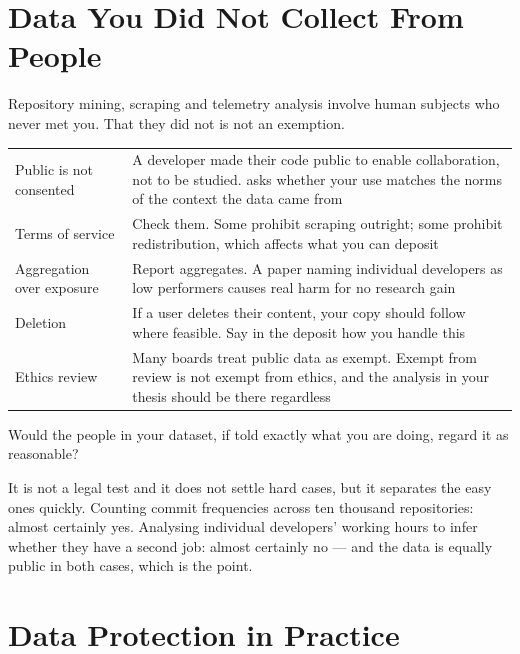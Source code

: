 \section{Data You Did Not Collect From People}

Repository mining, scraping and telemetry analysis involve human subjects who
never met you. That they did not is not an exemption.

\begin{center}
\small
\begin{tabular}{@{}L{3.4cm}L{10.9cm}@{}}
\toprule
Public is not consented
  & A developer made their code public to enable collaboration, not to be
    studied.  asks whether your use matches the
    norms of the context the data came from \\
Terms of service
  & Check them. Some prohibit scraping outright; some prohibit
    redistribution, which affects what you can deposit \\
Aggregation over exposure
  & Report aggregates. A paper naming individual developers as low performers
    causes real harm for no research gain \\
Deletion
  & If a user deletes their content, your copy should follow where feasible.
    Say in the deposit how you handle this \\
Ethics review
  & Many boards treat public data as exempt. Exempt from review is not exempt
    from ethics, and the analysis in your thesis should be there regardless \\
\bottomrule
\end{tabular}
\end{center}

\begin{conceptbox}
Would the people in your dataset, if told exactly what you are doing, regard it
as reasonable?

\medskip
It is not a legal test and it does not settle hard cases, but it separates the
easy ones quickly. Counting commit frequencies across ten thousand
repositories: almost certainly yes. Analysing individual developers' working
hours to infer whether they have a second job: almost certainly no --- and the
data is equally public in both cases, which is the point.
\end{conceptbox}

\section{Data Protection in Practice}

